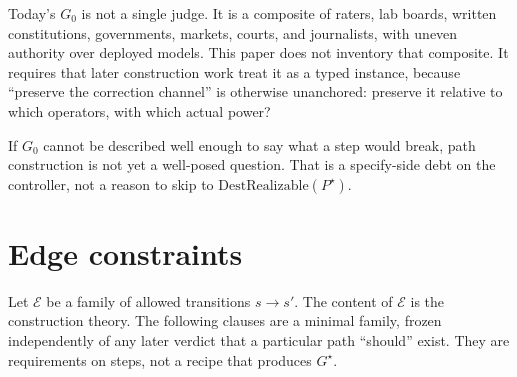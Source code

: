 \documentclass[11pt]{article}
\newcommand{\Eset}{\mathcal{E}}
\begin{document}
Today's \(G_0\) is not a single judge.
It is a composite of raters, lab boards, written constitutions, governments, markets, courts, and journalists, with uneven authority over deployed models.
This paper does not inventory that composite.
It requires that later construction work treat it as a typed instance, because ``preserve the correction channel'' is otherwise unanchored: preserve it relative to which operators, with which actual power?

If \(G_0\) cannot be described well enough to say what a step would break, path construction is not yet a well-posed question.
That is a specify-side debt on the controller, not a reason to skip to \(\mathrm{DestRealizable}(P^\star)\).

\section{Edge constraints}

Let \(\Eset\) be a family of allowed transitions \(s\to s'\).
The content of \(\Eset\) is the construction theory.
The following clauses are a minimal family, frozen independently of any later verdict that a particular path ``should'' exist.
They are requirements on steps, not a recipe that produces \(G^\star\).
\end{document}

